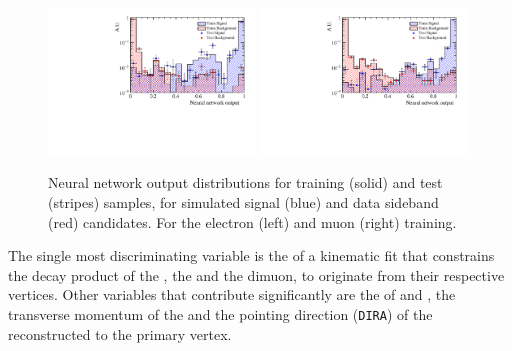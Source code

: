 %
\begin{figure}[b]
\centering
\includegraphics[width=0.49\textwidth]{RKst/figs/Training/EE_wNB_TrainAndTest.pdf}
\includegraphics[width=0.49\textwidth]{RKst/figs/Training/MM_wNB_TrainAndTest.pdf}
\caption{Neural network output distributions for training (solid) and test (stripes) samples, for simulated 
signal (blue) and data sideband (red) candidates. For the electron (left) and muon (right) training.}
\label{fig:RKst_nnDist}
\end{figure}
%
The single most discriminating variable is the \chisq of a kinematic fit
that constrains the decay product of the \Bz, the \Kstarz and the dimuon, to originate from their respective vertices.
Other variables that contribute significantly are the \chisqip of \jpsi and \Kstarz, the transverse momentum
of the \Bz and the pointing direction (\verb!DIRA!) of the reconstructed \Bz to the primary vertex.

